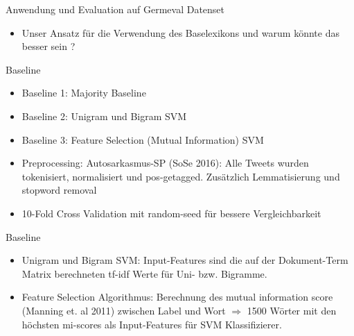 \documentclass{beamer}
\begin{document}
\begin{frame}[fragile]{Anwendung und Evaluation auf Germeval Datenset}
\begin{itemize}
\item Unser Ansatz für die Verwendung des Baselexikons und warum könnte das besser sein ?
\end{itemize}
\end{frame}

\begin{frame}{Baseline}
\begin{itemize}
\item Baseline 1: Majority Baseline
\item Baseline 2: Unigram und Bigram SVM
\item Baseline 3: Feature Selection (Mutual Information) SVM 
\item Preprocessing: Autosarkasmus-SP (SoSe 2016): Alle Tweets wurden tokenisiert, normalisiert und pos-getagged. Zusätzlich Lemmatisierung und stopword removal
\item 10-Fold Cross Validation mit random-seed für bessere Vergleichbarkeit
\end{itemize}
\end{frame}

\begin{frame}{Baseline}
\begin{itemize}
\item Unigram und Bigram SVM: Input-Features sind die auf der Dokument-Term Matrix berechneten tf-idf Werte für Uni- bzw. Bigramme.    
\item Feature Selection Algorithmus: Berechnung des mutual information score (Manning et. al 2011) zwischen Label und Wort $\Rightarrow$ 1500 Wörter mit den höchsten mi-scores als Input-Features für SVM Klassifizierer. 
\end{itemize}
\end{frame}
\end{document}
